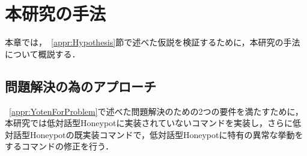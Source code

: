 \chapter{本研究の手法}
\label{meth}

本章では，~\ref{appr:Hypothesis}節で述べた仮説を検証するために，本研究の手法について概説する．

\section{問題解決の為のアプローチ}
\label{meth:appr2}
 ~\ref{appr:YotenForProblem}で述べた問題解決のための2つの要件を満たすために，本研究では低対話型Honeypotに実装されていないコマンドを実装し，さらに低対話型Honeypotの既実装コマンドで，低対話型Honeypotに特有の異常な挙動をするコマンドの修正を行う．


%



